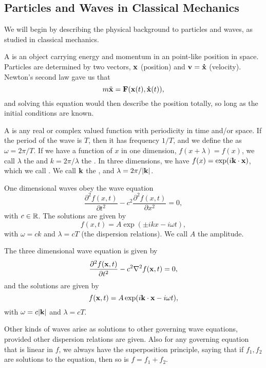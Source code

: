 \documentclass[a4paper]{scrartcl}
\begin{document}
\subsection{Particles and Waves in Classical Mechanics}

We will begin by describing the physical background to particles and waves, as studied in classical mechanics.

    

A  is an object carrying energy and momentum in an point-like position in space.
Particles are determined by two vectors, $\mathbf{x}$ (position) and $\mathbf{v} = \mathbf{\dot{x}}$ (velocity). Newton's second law gave us that
$$
    m \ddot{\mathbf{x}} = \mathbf{F}(\mathbf{x}(t), \mathbf{\dot{x}}(t)),
$$
and solving this equation would then describe the position totally, so long as the initial conditions are known.

A  is any real or complex valued function with periodicity in time and/or space. If the period of the wave is $T$, then it has frequency $1/T$, and we define the  as $\omega = 2 \pi / T$. If we have a function of $x$ in one dimension, $f(x + \lambda) = f(x)$, we call $\lambda$ the  and $k = 2\pi/\lambda$ the .
In three dimensions, we have $f(x) = \exp(i \mathbf{k} \cdot \mathbf{x})$, which we call . We call $\mathbf{k}$ the , and $\lambda = 2\pi/|\mathbf{k}|$.

One dimensional waves obey the wave equation
$$
    \frac{\partial^2 f(x, t)}{\partial t^2} - c^2 \frac{\partial^2 f(x, t)}{\partial x^2} = 0,
$$
with $c \in \mathbb{R}$. The solutions are given by
$$
    f(x, t) = A \exp(\pm i kx - i \omega t), 
$$
with $\omega = ck$ and $\lambda = cT$ (the dispersion relations). We call $A$ the amplitude.

The three dimensional wave equation is given by
$$
\frac{\partial^2 f(\mathbf{x}, t)}{\partial t^2} - c^2 \nabla^2 f(\mathbf{x}, t) = 0,
$$
and the solutions are given by
$$
f(\mathbf{x}, t) = A \exp(i \mathbf{k} \cdot \mathbf{x} - i \omega t),
$$
with $\omega = c |\mathbf{k}|$ and $\lambda = cT$.

Other kinds of waves arise as solutions to other governing wave equations, provided other dispersion relations are given.
Also for any governing equation that is linear in $f$, we always have the superposition principle, saying that if $f_1, f_2$ are solutions to the equation, then so is $f = f_1 + f_2$.
\end{document}
